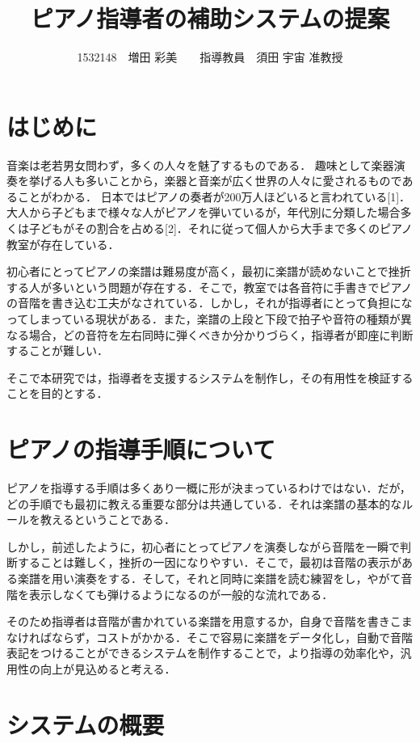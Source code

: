 \documentclass[twocolumn,10pt,a4j]{jsarticle}
\title{ピアノ指導者の補助システムの提案}
\author{1532148　増田 彩美　　指導教員　須田 宇宙 准教授}
\date{}
\begin{document}
\maketitle

\section{はじめに}

音楽は老若男女問わず，多くの人々を魅了するものである．
趣味として楽器演奏を挙げる人も多いことから，楽器と音楽が広く世界の人々に愛されるものであることがわかる．
日本ではピアノの奏者が200万人ほどいると言われている[1]．大人から子どもまで様々な人がピアノを弾いているが，年代別に分類した場合多くは子どもがその割合を占める[2]．それに従って個人から大手まで多くのピアノ教室が存在している．

初心者にとってピアノの楽譜は難易度が高く，最初に楽譜が読めないことで挫折する人が多いという問題が存在する．そこで，教室では各音符に手書きでピアノの音階を書き込む工夫がなされている．しかし，それが指導者にとって負担になってしまっている現状がある．また，楽譜の上段と下段で拍子や音符の種類が異なる場合，どの音符を左右同時に弾くべきか分かりづらく，指導者が即座に判断することが難しい．

そこで本研究では，指導者を支援するシステムを制作し，その有用性を検証することを目的とする．


\section{ピアノの指導手順について}
ピアノを指導する手順は多くあり一概に形が決まっているわけではない．だが，どの手順でも最初に教える重要な部分は共通している．それは楽譜の基本的なルールを教えるということである．

しかし，前述したように，初心者にとってピアノを演奏しながら音階を一瞬で判断することは難しく，挫折の一因になりやすい．そこで，最初は音階の表示がある楽譜を用い演奏をする．そして，それと同時に楽譜を読む練習をし，やがて音階を表示しなくても弾けるようになるのが一般的な流れである．

そのため指導者は音階が書かれている楽譜を用意するか，自身で音階を書きこまなければならず，コストがかかる．そこで容易に楽譜をデータ化し，自動で音階表記をつけることができるシステムを制作することで，より指導の効率化や，汎用性の向上が見込めると考える．

\section{システムの概要}
\end{document}
